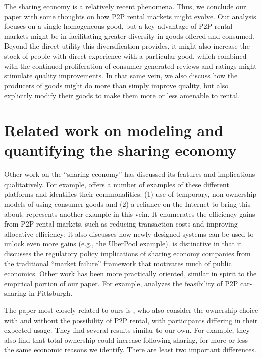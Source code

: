 \documentclass[11pt]{article}
\begin{document}
The sharing economy is a relatively recent phenomena.
Thus, we conclude our paper with some thoughts on how P2P rental markets might evolve.
Our analysis focuses on a single homogeneous good, but a key advantage of P2P rental markets might be in facilitating greater diversity in goods offered and consumed. 
Beyond the direct utility this diversification provides, it might also increase the stock of people with direct experience with a particular good, which combined with the continued proliferation of consumer-generated reviews and ratings might stimulate quality improvements. 
In that same vein, we also discuss how the producers of goods might do more than simply improve quality, but also explicitly modify their goods to make them more or less amenable to rental.

\section{Related work on modeling and quantifying the sharing economy}

Other work on the ``sharing economy'' has discussed its features and implications qualitatively. 
For example, \cite{belk2014you} offers a number of examples of these different platforms and identifies their commonalities: (1) use of temporary, non-ownership models of using consumer goods and (2) a reliance on the Internet to bring this about. 
\cite{edelman2015efficiencies} represents another example in this vein.
It enumerates the efficiency gains from P2P rental markets, such as reducing transaction costs and improving allocative efficiency;
it also discusses how newly designed systems can be used to unlock even more gains (e.g., the UberPool example). 
\citeauthor{edelman2015efficiencies} is distinctive in that it discusses the regulatory policy implications of sharing economy companies from the traditional ``market failure'' framework that motivates much of public economics.  
Other work has been more practically oriented, similar in spirit to the empirical portion of our paper.
For example, \cite{hampshire2011peer} analyzes the feasibility of P2P car-sharing in Pittsburgh.

The paper most closely related to ours is \cite{benjaafar2015peer},
who also consider the ownership choice with and without the possibility of P2P rental, with participants differing in their expected usage. 
They find several results similar to our own.
For example, they also find that total ownership could increase following sharing, for more or less the same economic reasons we identify.
There are least two important differences.
\end{document}
